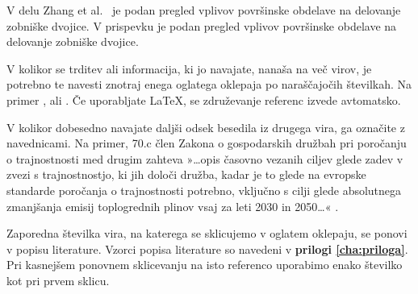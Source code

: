 V delu Zhang et al.~\cite{zhang2025} je podan pregled vplivov površinske obdelave na delovanje zobniške dvojice. V prispevku \cite{zhang2025} je podan pregled vplivov površinske obdelave na delovanje zobniške dvojice.

V kolikor se trditev ali informacija, ki jo navajate, nanaša na več virov, je potrebno te navesti znotraj enega oglatega oklepaja po naraščajočih številkah. Na primer \cite{grote2021,bower2025}, \cite{grote2021,bower2025,stephan2021,tsao1993} ali \cite{grote2021,stephan2021,zhang2025,zibert2025,niculuta2012,gyroid,dawkins,znidarsic2025,merkur2005,surs2009,zgd1,iso690}. Če uporabljate LaTeX, se združevanje referenc izvede avtomatsko.

V kolikor dobesedno navajate daljši odsek besedila iz drugega vira, ga označite z navednicami. Na primer, 70.c člen Zakona o gospodarskih družbah pri poročanju o trajnostnosti med drugim zahteva »\ldots{}opis časovno vezanih ciljev glede zadev v zvezi s trajnostnostjo, ki jih določi družba, kadar je to glede na evropske standarde poročanja o trajnostnosti potrebno, vključno s cilji glede absolutnega zmanjšanja emisij toplogrednih plinov vsaj za leti 2030 in 2050\ldots« \cite{zgd1}.

Zaporedna številka vira, na katerega se sklicujemo v oglatem oklepaju, se ponovi v popisu literature. Vzorci popisa literature so navedeni v \textbf{prilogi \ref{cha:priloga}}. Pri kasnejšem ponovnem sklicevanju na isto referenco uporabimo enako številko kot pri prvem sklicu.